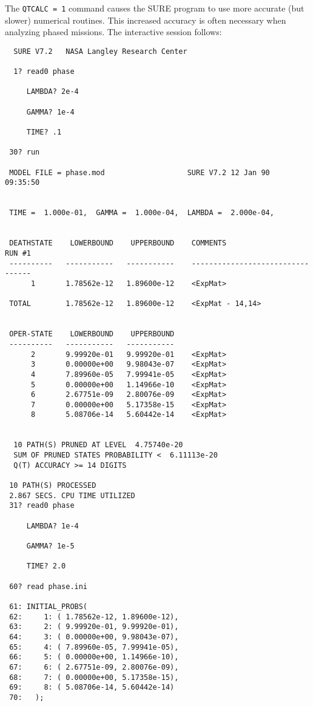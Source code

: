The \verb`QTCALC = 1` command causes the SURE program to use more
accurate (but slower) numerical routines.  This increased accuracy is often 
necessary when analyzing phased missions.  The interactive session follows:

\begin{verbatim}
  SURE V7.2   NASA Langley Research Center

  1? read0 phase

     LAMBDA? 2e-4

     GAMMA? 1e-4

     TIME? .1

 30? run

 MODEL FILE = phase.mod                   SURE V7.2 12 Jan 90   09:35:50


 TIME =  1.000e-01,  GAMMA =  1.000e-04,  LAMBDA =  2.000e-04,  
 

 DEATHSTATE    LOWERBOUND    UPPERBOUND    COMMENTS                 RUN #1
 ----------   -----------   -----------    ---------------------------------
      1       1.78562e-12   1.89600e-12    <ExpMat>

 TOTAL        1.78562e-12   1.89600e-12    <ExpMat - 14,14>


 OPER-STATE    LOWERBOUND    UPPERBOUND
 ----------   -----------   -----------
      2       9.99920e-01   9.99920e-01    <ExpMat>
      3       0.00000e+00   9.98043e-07    <ExpMat>
      4       7.89960e-05   7.99941e-05    <ExpMat>
      5       0.00000e+00   1.14966e-10    <ExpMat>
      6       2.67751e-09   2.80076e-09    <ExpMat>
      7       0.00000e+00   5.17358e-15    <ExpMat>
      8       5.08706e-14   5.60442e-14    <ExpMat>


  10 PATH(S) PRUNED AT LEVEL  4.75740e-20
  SUM OF PRUNED STATES PROBABILITY <  6.11113e-20
  Q(T) ACCURACY >= 14 DIGITS

 10 PATH(S) PROCESSED
 2.867 SECS. CPU TIME UTILIZED
 31? read0 phase

     LAMBDA? 1e-4

     GAMMA? 1e-5

     TIME? 2.0

 60? read phase.ini

 61: INITIAL_PROBS(
 62:     1: ( 1.78562e-12, 1.89600e-12),
 63:     2: ( 9.99920e-01, 9.99920e-01),
 64:     3: ( 0.00000e+00, 9.98043e-07),
 65:     4: ( 7.89960e-05, 7.99941e-05),
 66:     5: ( 0.00000e+00, 1.14966e-10),
 67:     6: ( 2.67751e-09, 2.80076e-09),
 68:     7: ( 0.00000e+00, 5.17358e-15),
 69:     8: ( 5.08706e-14, 5.60442e-14)
 70:   ); 


\end{verbatim}
